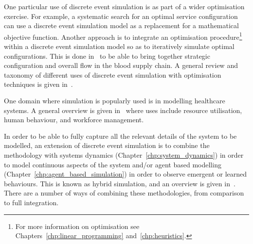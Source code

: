 One particular use of discrete event simulation is as part of a wider
optimisation exercise. For example, a systematic search for an optimal service
configuration can use a discrete event simulation model as a replacement for a
mathematical objective function. Another approach is to integrate an
optimisation procedure\footnote{For more information on optimisation see
Chapters~\ref{chp:linear_programming} and~\ref{chp:heuristics}.} within a
discrete event simulation model so as to iteratively simulate optimal
configurations. This is done in~\parencite{osorio2017simulation} to be able to
bring together strategic configuration and overall flow in the blood supply
chain. A general review and taxonomy of different uses of discrete event
simulation with optimisation techniques is given
in~\parencite{figueira2014hybrid}.

One domain where simulation is popularly used is in modelling healthcare systems.
A general overview is given in~\parencite{brailsford2009analysis} where uses
include resource utilisation, human behaviour, and workforce management.

In order to be able to fully capture all the relevant details of the system to
be modelled, an extension of discrete event simulation is to combine the
methodology with systems dynamics (Chapter~\ref{chp:system_dynamics}) in order
to model continuous aspects of the system and/or agent based modelling
(Chapter~\ref{chp:agent_based_simulation}) in order to observe emergent or
learned behaviours. This is known as hybrid simulation, and an overview is given
in~\parencite{brailsford2019hybrid}. There are a number of ways of combining
these methodologies, from comparison to full integration.

